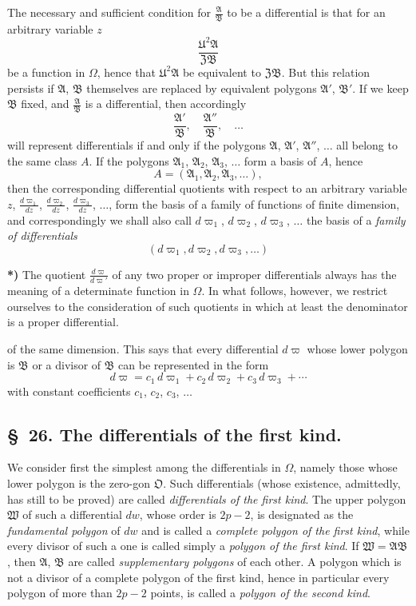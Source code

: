 \documentclass{article}
\begin{document}
The necessary and sufficient condition for $\frac{\mathfrak{A}}{\mathfrak{B}}$ to be a differential is that for an arbitrary variable $z$
\[ \frac{\mathfrak{U}^{2}\mathfrak{A}}{\mathfrak{Z}\mathfrak{B}} \]
be a function in $\Omega$, hence that $\mathfrak{U}^{2}\mathfrak{A}$ be equivalent to $\mathfrak{Z}\mathfrak{B}$. But this relation persists if $\mathfrak{A}$, $\mathfrak{B}$ themselves are replaced by equivalent polygons $\mathfrak{A}'$, $\mathfrak{B}'$. If we keep $\mathfrak{B}$ fixed, and $\frac{\mathfrak{A}}{\mathfrak{B}}$ is a differential, then accordingly
\[ \frac{\mathfrak{A}'}{\mathfrak{B}}, \quad \frac{\mathfrak{A}''}{\mathfrak{B}}, \quad \ldots \]
will represent differentials if and only if the polygons $\mathfrak{A}$, $\mathfrak{A}'$, $\mathfrak{A}''$, $\ldots$ all belong to the same class $A$. If the polygons $\mathfrak{A}_{1}$, $\mathfrak{A}_{2}$, $\mathfrak{A}_{3}$, $\ldots$ form a basis of $A$, hence
\[ A = (\mathfrak{A}_{1}, \mathfrak{A}_{2}, \mathfrak{A}_{3}, \ldots), \]
then the corresponding differential quotients with respect to an arbitrary variable $z$, $\frac{d\varpi_{1}}{dz}$, $\frac{d\varpi_{2}}{dz}$, $\frac{d\varpi_{3}}{dz}$, $\ldots$, form the basis of a family of functions of finite dimension, and correspondingly we shall also call $d\varpi_{1}$, $d\varpi_{2}$, $d\varpi_{3}$, $\ldots$ the basis of a \emph{family of differentials}
\[ (d\varpi_{1}, d\varpi_{2}, d\varpi_{3}, \ldots) \]

\textbf{*)} The quotient $\frac{d\varpi}{d\varpi'}$ of any two proper or improper differentials always has the meaning of a determinate function in $\Omega$. In what follows, however, we restrict ourselves to the consideration of such quotients in which at least the denominator is a proper differential.

of the same dimension. This says that every differential $d\varpi$ whose lower polygon is $\mathfrak{B}$ or a divisor of $\mathfrak{B}$ can be represented in the form
\[ d\varpi = c_{1}\,d\varpi_{1} + c_{2}\,d\varpi_{2} + c_{3}\,d\varpi_{3} + \cdots \]
with constant coefficients $c_{1}$, $c_{2}$, $c_{3}$, $\ldots$

\subsection*{§~26. The differentials of the first kind.}

We consider first the simplest among the differentials in $\Omega$, namely those whose lower polygon is the zero-gon $\mathfrak{O}$. Such differentials (whose existence, admittedly, has still to be proved) are called \emph{differentials of the first kind}. The upper polygon $\mathfrak{W}$ of such a differential $dw$, whose order is $2p-2$, is designated as the \emph{fundamental polygon} of $dw$ and is called a \emph{complete polygon of the first kind}, while every divisor of such a one is called simply a \emph{polygon of the first kind}. If $\mathfrak{W} = \mathfrak{A}\mathfrak{B}$, then $\mathfrak{A}$, $\mathfrak{B}$ are called \emph{supplementary polygons} of each other. A polygon which is not a divisor of a complete polygon of the first kind, hence in particular every polygon of more than $2p-2$ points, is called a \emph{polygon of the second kind}.
\end{document}
